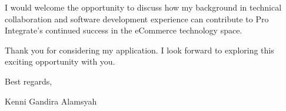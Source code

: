 \documentclass[12pt]{article}
\newcommand{\svspace}{\vspace*{0.5em}}
\begin{document}
\svspace

I would welcome the opportunity to discuss how my background in technical collaboration and software development experience can contribute to Pro Integrate's continued success in the eCommerce technology space.

\svspace

Thank you for considering my application. I look forward to exploring this exciting opportunity with you.

\svspace

Best regards,

\svspace

Kenni Gandira Alamsyah
\end{document}
